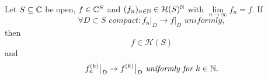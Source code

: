 \begin{lemma}
	Let $S \subseteq \mathbb{C}$ be open, $f \in \mathbb{C}^S$ and $(f_n)_{n \in \mathbb{N}} \in \mathcal{H}(S)^{\mathbb{N}}$ with $\lim\limits_{n \to \infty} f_n = f$. If
\begin{equation*}
	\forall D \subset S \textit{ compact}: f_n\big\vert _D \to f\big\vert _D \textit{ uniformly},
\end{equation*}
	then
\begin{equation}
	f \in \mathcal{H}(S)
\end{equation}
	and
\begin{equation}
	f_n^{(k)}\big\vert _D \to f^{(k)}\big\vert _D \textit{ uniformly for } k \in \mathbb{N}.
\end{equation}
\end{lemma}

